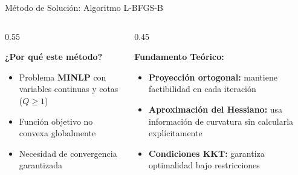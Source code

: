 \documentclass[
  ignorenonframetext,
]{beamer}
\begin{document}
\begin{frame}{Método de Solución: Algoritmo L-BFGS-B}
\label{muxe9todo-de-soluciuxf3n-algoritmo-l-bfgs-b}
\begin{columns}[T]
\begin{column}{0.55\linewidth}
\justifying
{}

\textbf{¿Por qué este método?}

\begin{itemize}
\item Problema \textbf{MINLP} con variables continuas y cotas ($Q \geq 1$)
\item Función objetivo no convexa globalmente
\item Necesidad de convergencia garantizada
\end{itemize}
\end{column}

\begin{column}{0.45\linewidth}
\justifying
{}

\textbf{Fundamento Teórico:}

\begin{itemize}
\item \textbf{Proyección ortogonal:} mantiene factibilidad en cada iteración
\item \textbf{Aproximación del Hessiano:} usa información de curvatura sin calcularla explícitamente
\item \textbf{Condiciones KKT:} garantiza optimalidad bajo restricciones
\end{itemize}
\end{column}
\end{columns}
\end{frame}
\end{document}
